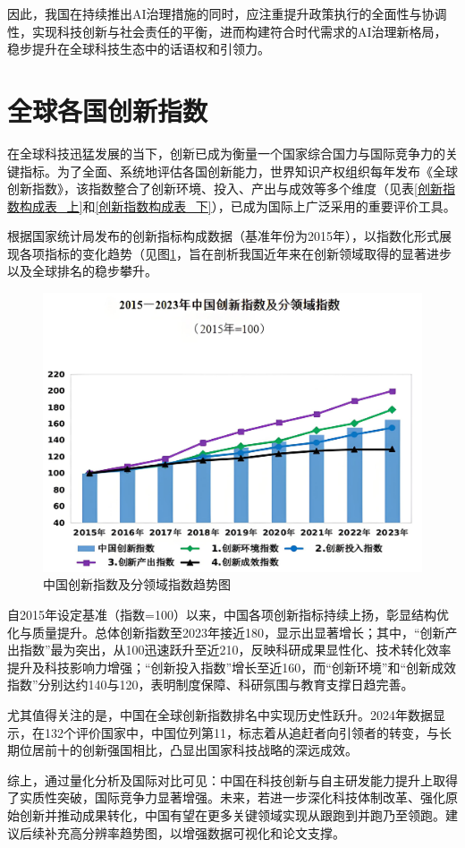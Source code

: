因此，我国在持续推出AI治理措施的同时，应注重提升政策执行的全面性与协调性，实现科技创新与社会责任的平衡，进而构建符合时代需求的AI治理新格局，稳步提升在全球科技生态中的话语权和引领力。\cite{butcher2023global}
\section{全球各国创新指数}
在全球科技迅猛发展的当下，创新已成为衡量一个国家综合国力与国际竞争力的关键指标。为了全面、系统地评估各国创新能力，世界知识产权组织每年发布《全球创新指数》，该指数整合了创新环境、投入、产出与成效等多个维度（见表\ref{创新指数构成表_上}和\ref{创新指数构成表_下}），已成为国际上广泛采用的重要评价工具。

根据国家统计局发布的创新指标构成数据（基准年份为2015年），以指数化形式展现各项指标的变化趋势（见图\ref{中国创新指数及分领域指数趋势图}，旨在剖析我国近年来在创新领域取得的显著进步以及全球排名的稳步攀升。

\begin{figure}[H]
    \centering
    \includegraphics[width=0.7\linewidth]{figure/22中国创新指数及分领域指数趋势图.png}
    \caption{中国创新指数及分领域指数趋势图}
    \label{中国创新指数及分领域指数趋势图}
\end{figure}
自2015年设定基准（指数=100）以来，中国各项创新指标持续上扬，彰显结构优化与质量提升。总体创新指数至2023年接近180，显示出显著增长；其中，“创新产出指数”最为突出，从100迅速跃升至近210，反映科研成果显性化、技术转化效率提升及科技影响力增强；“创新投入指数”增长至近160，而“创新环境”和“创新成效指数”分别达约140与120，表明制度保障、科研氛围与教育支撑日趋完善。

尤其值得关注的是，中国在全球创新指数排名中实现历史性跃升。2024年数据显示，在132个评价国家中，中国位列第11，标志着从追赶者向引领者的转变，与长期位居前十的创新强国相比，凸显出国家科技战略的深远成效。

综上，通过量化分析及国际对比可见：中国在科技创新与自主研发能力提升上取得了实质性突破，国际竞争力显著增强。未来，若进一步深化科技体制改革、强化原始创新并推动成果转化，中国有望在更多关键领域实现从跟跑到并跑乃至领跑。建议后续补充高分辨率趋势图，以增强数据可视化和论文支撑。
